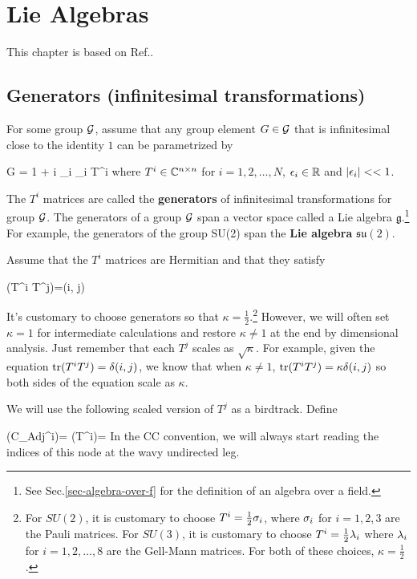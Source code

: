 \chapter{Lie Algebras}
\label{ch-lie-alg}

This chapter is based on 
Ref.\cite{birdtracks-book}.
\section{Generators (infinitesimal transformations)}

For some group
${\cal G}$, assume that any group element $G\in{\cal G}$
that is infinitesimal 
close to the identity
$1$ can be parametrized by


\beq
G = 1 + i \sum_i 
\eps_i T^i
\eeq
where $T^i\in { \mathbb{C}}^{n\times n}$
for $i=1,2, \ldots, N$,
$\epsilon_i\in{ \mathbb{R}} $
and $|\epsilon_i|<<1$.

The $T^i$ matrices are called
the {\bf generators}
of infinitesimal transformations
for group ${\cal G}$.
The generators of a group ${\cal G}$ span a vector space 
called a Lie algebra $\mathfrak{g}$.\footnote{See Sec.\ref{sec-algebra-over-f}
for the definition of an algebra over a field.
} For example,
the generators of the group SU(2) 
span the {\bf Lie algebra} $\mathfrak{su(2)}$.


Assume that the $T^i$ matrices are Hermitian and
that they satisfy

\beq
\tr(T^i T^j)=\kappa\delta(i, j)
\label{eq-gluon-mass}
\eeq


It's customary to choose 
generators so that  $\kappa=\frac{1}{2}$.\footnote{For $SU(2)$,
it is customary to
choose $T^i =\frac{1}{2}\sigma_i$,
where $\sigma_i$ for $i=1,2,3$ are the Pauli matrices.
For $SU(3)$,
it is customary to choose $T^i=
\frac{1}{2}\lambda_i$
where $\lambda_i$
for $i=1,2, \ldots, 8$ are the Gell-Mann matrices.
For both of these choices,
$\kappa=\frac{1}{2}$.}
However, we will often set $\kappa=1$
for intermediate calculations
and restore $\kappa\neq 1$ at the end by dimensional analysis.
Just remember that each $T^j$ scales as $\sqrt{\kappa}$.
For example, given
the equation 
${\rm tr }(T^iT^j)=\delta(i,j)$,
we know that when $\kappa\neq 1$,
${\rm tr }(T^iT^j)=\kappa\delta(i,j)$
so both sides of the equation scale as $\kappa$.

We will use
the following
scaled version of $T^j$
as a birdtrack. Define

\beq
(C_{Adj}^i)=
(T^i)=
\bcen
{}
\ecen
\eeq
In the CC convention, we will always
start reading the indices 
of this node at the wavy undirected leg.

